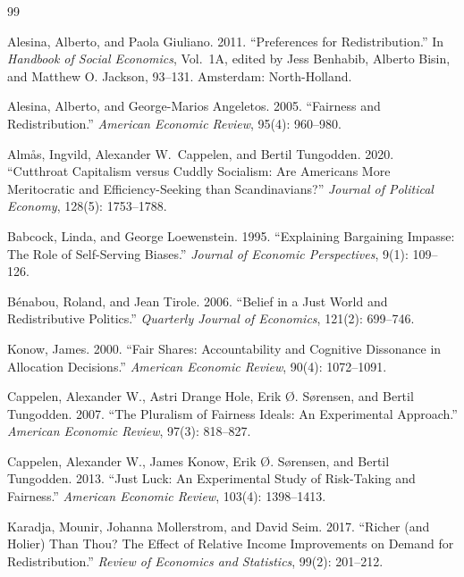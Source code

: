 \documentclass[12pt]{article}
\begin{document}
\newpage

\begin{thebibliography}{99}

Alesina, Alberto, and Paola Giuliano. 2011.
``Preferences for Redistribution.''
In \textit{Handbook of Social Economics}, Vol.~1A, edited by Jess Benhabib,
Alberto Bisin, and Matthew O. Jackson, 93--131. Amsterdam: North-Holland.

Alesina, Alberto, and George-Marios Angeletos. 2005.
``Fairness and Redistribution.''
\textit{American Economic Review}, 95(4): 960--980.

Alm\aa{}s, Ingvild, Alexander W.\ Cappelen, and Bertil Tungodden. 2020.
``Cutthroat Capitalism versus Cuddly Socialism: Are Americans More
Meritocratic and Efficiency-Seeking than Scandinavians?''
\textit{Journal of Political Economy}, 128(5): 1753--1788.

Babcock, Linda, and George Loewenstein. 1995.
``Explaining Bargaining Impasse: The Role of Self-Serving Biases.''
\textit{Journal of Economic Perspectives}, 9(1): 109--126.

B\'enabou, Roland, and Jean Tirole. 2006.
``Belief in a Just World and Redistributive Politics.''
\textit{Quarterly Journal of Economics}, 121(2): 699--746.

Konow, James. 2000.
``Fair Shares: Accountability and Cognitive Dissonance in Allocation
Decisions.''
\textit{American Economic Review}, 90(4): 1072--1091.

Cappelen, Alexander W., Astri Drange Hole, Erik \O. S\o{}rensen, and Bertil
Tungodden. 2007.
``The Pluralism of Fairness Ideals: An Experimental Approach.''
\textit{American Economic Review}, 97(3): 818--827.

Cappelen, Alexander W., James Konow, Erik \O. S\o{}rensen, and Bertil
Tungodden. 2013.
``Just Luck: An Experimental Study of Risk-Taking and Fairness.''
\textit{American Economic Review}, 103(4): 1398--1413.

Karadja, Mounir, Johanna Mollerstrom, and David Seim. 2017.
``Richer (and Holier) Than Thou? The Effect of Relative Income Improvements
on Demand for Redistribution.''
\textit{Review of Economics and Statistics}, 99(2): 201--212.


\end{thebibliography}
\end{document}
